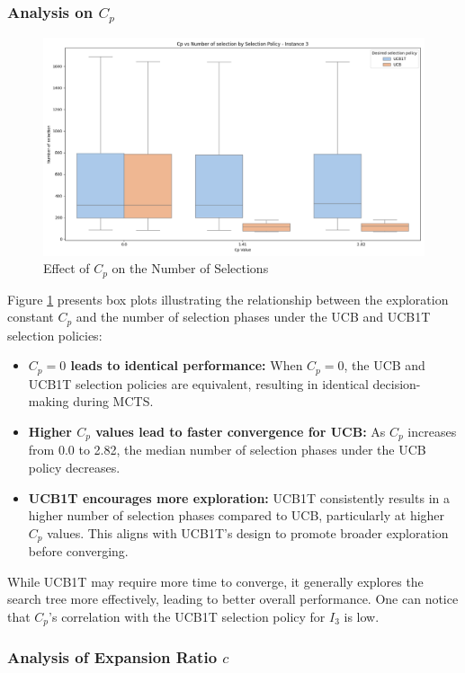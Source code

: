 \subsubsection*{Analysis on $C_p$}

\begin{figure}[!ht]
    \centering
    \includegraphics[width=.4\textwidth]{Figures/3 - cp_vs_selection.png}
    \caption{Effect of \(C_p\) on the Number of Selections}
    \label{fig:cp_vs_selection_3}
\end{figure}

Figure \ref{fig:cp_vs_selection_3} presents box plots illustrating the relationship between the exploration constant \(C_p\) and the number of selection phases under the UCB and UCB1T selection policies:

\begin{itemize}
    \item \textbf{\(C_p = 0\) leads to identical performance:}
          When \(C_p = 0\), the UCB and UCB1T selection policies are equivalent, resulting in identical decision-making during MCTS.
    \item \textbf{Higher \(C_p\) values lead to faster convergence for UCB:}
          As \(C_p\) increases from 0.0 to 2.82, the median number of selection phases under the UCB policy decreases.
    \item \textbf{UCB1T encourages more exploration:}
          UCB1T consistently results in a higher number of selection phases compared to UCB, particularly at higher \(C_p\) values. This aligns with UCB1T's design to promote broader exploration before converging.
\end{itemize}

While UCB1T may require more time to converge, it generally explores the search tree more effectively, leading to better overall performance. One can notice that $C_p$'s correlation with the UCB1T selection policy for $I_3$ is low.

\subsubsection*{Analysis of Expansion Ratio $c$}

